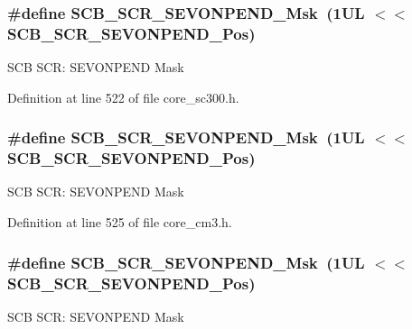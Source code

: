 \subsubsection[{\texorpdfstring{S\+C\+B\+\_\+\+S\+C\+R\+\_\+\+S\+E\+V\+O\+N\+P\+E\+N\+D\+\_\+\+Msk}{SCB_SCR_SEVONPEND_Msk}}]{\setlength{\rightskip}{0pt plus 5cm}\#define S\+C\+B\+\_\+\+S\+C\+R\+\_\+\+S\+E\+V\+O\+N\+P\+E\+N\+D\+\_\+\+Msk~(1\+U\+L $<$$<$ S\+C\+B\+\_\+\+S\+C\+R\+\_\+\+S\+E\+V\+O\+N\+P\+E\+N\+D\+\_\+\+Pos)}\hypertarget{group___c_m_s_i_s___s_c_b_gafb98656644a14342e467505f69a997c9}{}\label{group___c_m_s_i_s___s_c_b_gafb98656644a14342e467505f69a997c9}
S\+CB S\+CR\+: S\+E\+V\+O\+N\+P\+E\+ND Mask 

Definition at line 522 of file core\+\_\+sc300.\+h.

\subsubsection[{\texorpdfstring{S\+C\+B\+\_\+\+S\+C\+R\+\_\+\+S\+E\+V\+O\+N\+P\+E\+N\+D\+\_\+\+Msk}{SCB_SCR_SEVONPEND_Msk}}]{\setlength{\rightskip}{0pt plus 5cm}\#define S\+C\+B\+\_\+\+S\+C\+R\+\_\+\+S\+E\+V\+O\+N\+P\+E\+N\+D\+\_\+\+Msk~(1\+U\+L $<$$<$ S\+C\+B\+\_\+\+S\+C\+R\+\_\+\+S\+E\+V\+O\+N\+P\+E\+N\+D\+\_\+\+Pos)}\hypertarget{group___c_m_s_i_s___s_c_b_gafb98656644a14342e467505f69a997c9}{}\label{group___c_m_s_i_s___s_c_b_gafb98656644a14342e467505f69a997c9}
S\+CB S\+CR\+: S\+E\+V\+O\+N\+P\+E\+ND Mask 

Definition at line 525 of file core\+\_\+cm3.\+h.

\subsubsection[{\texorpdfstring{S\+C\+B\+\_\+\+S\+C\+R\+\_\+\+S\+E\+V\+O\+N\+P\+E\+N\+D\+\_\+\+Msk}{SCB_SCR_SEVONPEND_Msk}}]{\setlength{\rightskip}{0pt plus 5cm}\#define S\+C\+B\+\_\+\+S\+C\+R\+\_\+\+S\+E\+V\+O\+N\+P\+E\+N\+D\+\_\+\+Msk~(1\+U\+L $<$$<$ S\+C\+B\+\_\+\+S\+C\+R\+\_\+\+S\+E\+V\+O\+N\+P\+E\+N\+D\+\_\+\+Pos)}\hypertarget{group___c_m_s_i_s___s_c_b_gafb98656644a14342e467505f69a997c9}{}\label{group___c_m_s_i_s___s_c_b_gafb98656644a14342e467505f69a997c9}
S\+CB S\+CR\+: S\+E\+V\+O\+N\+P\+E\+ND Mask 

